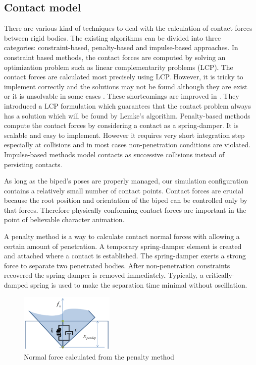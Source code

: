 \documentclass{acm_proc_article-sp}
\begin{document}
\subsection{Contact model}

There are various kind of techniques to deal with the calculation of contact forces between rigid bodies.
The existing algorithms can be divided into three categories: constraint-based, penalty-based and impulse-based approaches.
In constraint based methods, the contact forces are computed by solving an optimization problem such as linear complementarity problems (LCP).
The contact forces are calculated most precisely using LCP.
However, it is tricky to implement correctly and the solutions may not be found although they are exist or it is unsolvable in some cases \cite{StewartT00}.
These shortcomings are improved in \cite{Anitescu}.
They introduced a LCP formulation which guarantees that the contact problem always has a solution which will be found by Lemke's algorithm.
Penalty-based methods compute the contact forces by considering a contact as a spring-damper.
It is scalable and easy to implement. However it requires very short integration step especially at collisions and in most cases non-penetration conditions are violated.
Impulse-based methods model contacts as successive collisions instead of persisting contacts.

As long as the biped's poses are properly managed, our simulation configuration contains a relatively small number of contact points.
Contact forces are crucial because the root position and orientation of the biped can be controlled only by that forces.
Therefore physically conforming contact forces are important in the point of believable character animation.

A penalty method is a way to calculate contact normal forces with allowing a certain amount of penetration.
A temporary spring-damper element is created and attached where a contact is established.
The spring-damper exerts a strong force to separate two penetrated bodies.
After non-penetration constraints recovered the spring-damper is removed immediately.
Typically, a critically-damped spring is used to make the separation time minimal without oscillation.

\begin{figure}[h!]
  \centering
  \includegraphics[width=1.8in]{penalty}
  \caption{Normal force calculated from the penalty method}
\end{figure}
\end{document}
